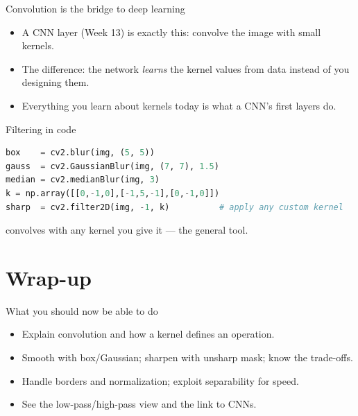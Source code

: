 \documentclass[10pt,aspectratio=169]{beamer}
\begin{document}
\begin{frame}{Convolution is the bridge to deep learning}
  \begin{itemize}
    \item A CNN layer (Week 13) is exactly this: convolve the image with small kernels.
    \item The difference: the network \emph{learns} the kernel values from data instead of you designing them.
    \item Everything you learn about kernels today is what a CNN's first layers do.
  \end{itemize}
\end{frame}

\begin{frame}[fragile]{Filtering in code}
\begin{lstlisting}[language=Python]
box    = cv2.blur(img, (5, 5))
gauss  = cv2.GaussianBlur(img, (7, 7), 1.5)
median = cv2.medianBlur(img, 3)
k = np.array([[0,-1,0],[-1,5,-1],[0,-1,0]])
sharp  = cv2.filter2D(img, -1, k)          # apply any custom kernel
\end{lstlisting}
   convolves with any kernel you give it — the general tool.
\end{frame}

\section{Wrap-up}

\begin{frame}{What you should now be able to do}
  \begin{itemize}
    \item Explain convolution and how a kernel defines an operation.
    \item Smooth with box/Gaussian; sharpen with unsharp mask; know the trade-offs.
    \item Handle borders and normalization; exploit separability for speed.
    \item See the low-pass/high-pass view and the link to CNNs.
  \end{itemize}
\end{frame}
\end{document}
